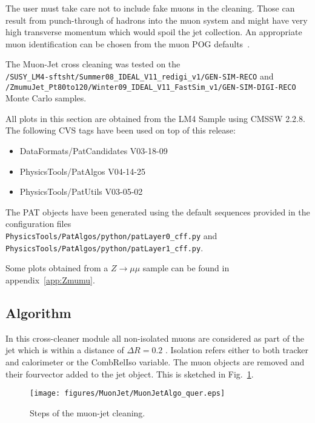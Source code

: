 \documentclass{cmspaper}
\begin{document}
The user must take care not to include fake muons in the cleaning. Those can
result from punch-through of hadrons into the muon system and might have very
high transverse momentum which would spoil the jet collection. An appropriate
muon identification can be chosen from the muon POG defaults~\cite{muonID}.

The Muon-Jet cross cleaning was tested on the\\
\texttt{/SUSY\_LM4-sftsht/Summer08\_IDEAL\_V11\_redigi\_v1/GEN-SIM-RECO} and\\
\texttt{/ZmumuJet\_Pt80to120/Winter09\_IDEAL\_V11\_FastSim\_v1/GEN-SIM-DIGI-RECO}
Monte Carlo samples.

All plots in this section are obtained from the LM4 Sample using CMSSW 2.2.8.
The following CVS tags have been used on top of this release:
\begin{itemize}
    \item DataFormats/PatCandidates V03-18-09      
    \item PhysicsTools/PatAlgos     V04-14-25      
    \item PhysicsTools/PatUtils     V03-05-02      
\end{itemize}
The PAT objects
have been generated using the default sequences provided in the configuration
files\\
\texttt{PhysicsTools/PatAlgos/python/patLayer0\_cff.py} and\\
\texttt{PhysicsTools/PatAlgos/python/patLayer1\_cff.py}.

Some plots obtained from a $Z\rightarrow\mu\mu$ sample can be found in appendix~\ref{app:Zmumu}.


\subsection{Algorithm}
In this cross-cleaner module all non-isolated muons are considered as part of
the jet which is within a distance of $\Delta R=0.2$ . Isolation refers either
to both tracker and calorimeter or the CombRelIso variable. The muon objects
are removed and their fourvector added to the jet object. 
This is sketched in Fig.~\ref{fig:MJCleaning}.

\begin{figure}[hbt]
\begin{center}
\texttt{[image: figures/MuonJet/MuonJetAlgo\_quer.eps]}
\caption{Steps of the muon-jet cleaning.}
\label{fig:MJCleaning}
\end{center}
\end{figure}
\end{document}
